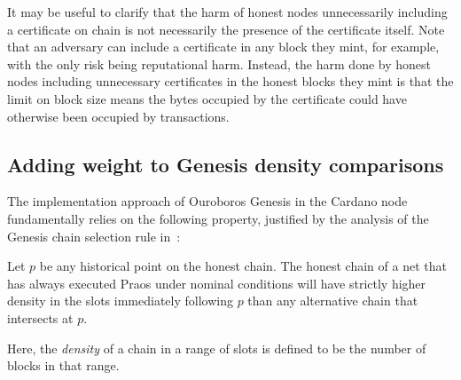 It may be useful to clarify that the harm of honest nodes unnecessarily including a certificate on chain is not necessarily the presence of the certificate itself.
Note that an adversary can include a certificate in any block they mint, for example, with the only risk being reputational harm.
Instead, the harm done by honest nodes including unnecessary certificates in the honest blocks they mint is that the limit on block size means the bytes occupied by the certificate could have otherwise been occupied by transactions.

\subsection{Adding weight to Genesis density comparisons}\label{sec:weighted genesis}

The implementation approach of Ouroboros Genesis in the Cardano node fundamentally relies on the following property, justified by the analysis of the Genesis chain selection rule in~\cite{badertscher2018ouroboros}:
\begin{tcolorbox}[title=\densityOfCompetingChainsName]\label{property:density-of-competing-chains}
  Let $p$ be any historical point on the honest chain. The honest chain of a net that has always executed Praos under nominal conditions will have strictly higher density in the \sgen{} slots immediately following $p$ than any alternative chain that intersects at $p$.
\end{tcolorbox}
Here, the \emph{density} of a chain in a range of slots is defined to be the number of blocks in that range.

